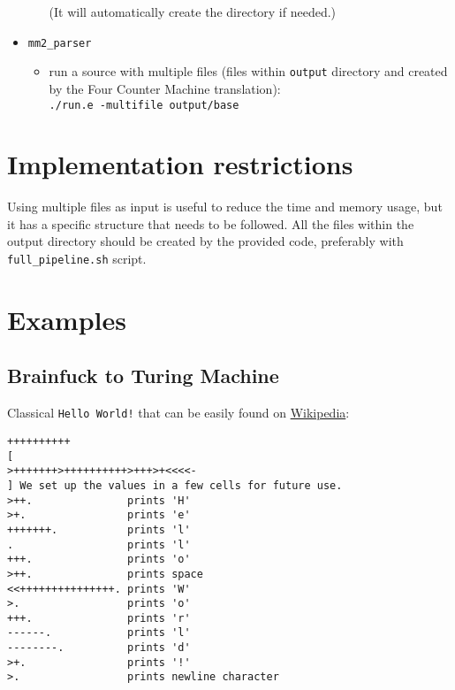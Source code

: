 \documentclass[english,shortabstract,mgr]{iithesis}
\begin{document}
\begin{itemize}
\begin{itemize}
        (It will automatically create the directory if needed.)
    \end{itemize}
  \item \texttt{mm2\_parser}
    \begin{itemize}
      \item run a source with multiple files (files within \texttt{output}
        directory and created by the Four Counter Machine translation): \\ \texttt{./run.e -multifile output/base}
    \end{itemize}
\end{itemize}


\section{Implementation restrictions}

Using multiple files as input is useful to reduce the time and memory
usage, but it has a specific structure that needs to be followed. All the files
within the output directory should be created by the provided code, preferably
with \texttt{full\_pipeline.sh} script.

\section{Examples}

\subsection{Brainfuck to Turing Machine}

Classical \texttt{Hello World!} that can be easily found on \href{https://pl.wikipedia.org/wiki/Brainfuck#Przyk%C5%82ady}{Wikipedia}:

\begin{verbatim}
++++++++++
[
>+++++++>++++++++++>+++>+<<<<-
] We set up the values in a few cells for future use.
>++.               prints 'H'
>+.                prints 'e'
+++++++.           prints 'l'
.                  prints 'l'
+++.               prints 'o'
>++.               prints space
<<+++++++++++++++. prints 'W'
>.                 prints 'o'
+++.               prints 'r'
------.            prints 'l'
--------.          prints 'd'
>+.                prints '!'
>.                 prints newline character
\end{verbatim}
\end{document}
